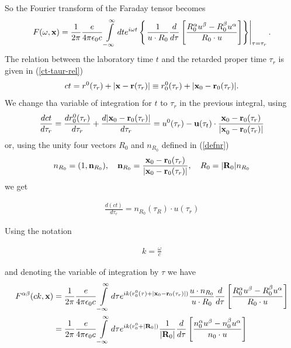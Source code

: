 So the Fourier transform of the Faraday tensor becomes
\begin{align}
  F(\omega, {\bf x}) = \frac1{2\pi}\frac{e}{4\pi\epsilon_0c}\int\limits_{-\infty}^{\infty} dt e^{i\omega t}\left\{\left.\frac1{u\cdot R_0} \frac{d}{d\tau}\left[ \frac{R_0^{\alpha}u^{\beta}-R_0^{\beta}u^{\alpha}}{R_0\cdot u}\right]\right\}\right|_{\tau=\tau_r}.\label{eq:ft-simplified-total-integral}
\end{align}
The relation between the laboratory time $t$ and the retarded proper time $\tau_r$ is given in (\ref{ct-taur-rel})
\begin{align}
  ct= r^0(\tau_r)+|{\bf x}-{\bf r}(\tau_r)| \equiv r_0^0(\tau_r)+|{\bf x}_0-{\bf r}_0(\tau_r)|.
\end{align}
We change tha variable of integration for $t$ to $\tau_r$ in the previous integral, using
\begin{align}
  \frac{d{ct}}{d\tau_r} = \frac{dr_0^0(\tau_r)}{d\tau_r} + \frac{d|{\bf x}_0 -{\bf r}_0(\tau_r)|}{d\tau_r} = u^0(\tau_r) - {\bf u}(\tau_t)\cdot\frac{{\bf x}_0 -{\bf r}_0(\tau_r)}{{|\bf x}_0 -{\bf r}_0(\tau_r)|}
\end{align}
or, using the unity four vectors $R_0$ and   $n_{R_0}$ defined in (\ref{defnr})
\begin{align}
  n_{R_0}=(1,{\bf n}_{R_0}),\quad {\bf n}_{R_0}=\frac{{\bf x}_0-{\bf r}_0(\tau_r)}{|{\bf x}_0-{\bf r}_0(\tau_r)|},\quad  R_0 =  |{\bf R}_0|n_{R_0}
\end{align}
we get
\begin{importantbox}
  \begin{align}
    \frac{d(ct)}{d\tau_r} = {n_{R_0}(\tau_R)\cdot u(\tau_r)}
  \end{align}
\end{importantbox}
Using the notation
\begin{importantbox}
  \begin{align}
    k = \frac{\omega}c\label{defk}
  \end{align}
\end{importantbox}
and denoting the variable of integration by $\tau$ we have
\begin{align}
  F^{\alpha\beta}(c k, {\bf x}) &= \frac1{2\pi}\frac{e}{4\pi\epsilon_0c}\int\limits_{-\infty}^{\infty} d\tau e^{i k (r_0^0(\tau)+|{\bf x}_0-{\bf r}_0(\tau_r)|)}\frac{u\cdot n_{R_0}}{u\cdot R_0} \frac{d}{d\tau}\left[ \frac{R_0^{\alpha}u^{\beta}-R_0^{\beta}u^{\alpha}}{R_0\cdot u}\right]\nonumber\\
  &= \frac1{2\pi}\frac{e}{4\pi\epsilon_0c}\int\limits_{-\infty}^{\infty} d\tau e^{i k (r_0^0+|{\bf R}_0|)}\frac{1}{|{\bf R}_0|} \frac{d}{d\tau}\left[ \frac{n_0^{\alpha}u^{\beta}-n_0^{\beta}u^{\alpha}}{n_0\cdot u}\right]\nonumber\\
\end{align}
